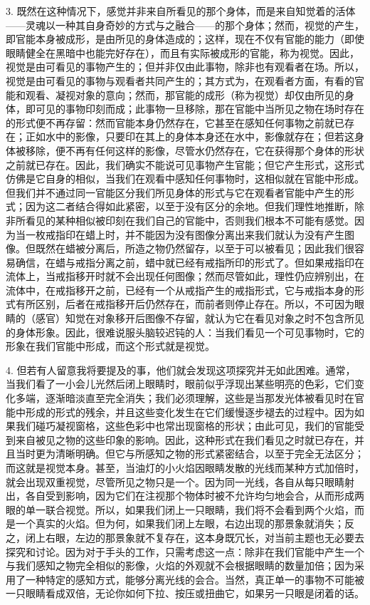 3. 既然在这种情况下，感觉并非来自所看见的那个身体，而是来自知觉着的活体——灵魂以一种其自身奇妙的方式与之融合——的那个身体；然而，视觉的产生，即官能本身被成形，是由所见的身体造成的；这样，现在不仅有官能的能力（即使眼睛健全在黑暗中也能完好存在），而且有实际被成形的官能，称为视觉。因此，视觉是由可看见的事物产生的；但并非仅由此事物，除非也有观看者在场。所以，视觉是由可看见的事物与观看者共同产生的；其方式为，在观看者方面，有看的官能和观看、凝视对象的意向；然而，那官能的成形（称为视觉）却仅由所见的身体，即可见的事物印刻而成；此事物一旦移除，那在官能中当所见之物在场时存在的形式便不再存留：然而官能本身仍然存在，它甚至在感知任何事物之前就已存在；正如水中的影像，只要印在其上的身体本身还在水中，影像就存在；但若这身体被移除，便不再有任何这样的影像，尽管水仍然存在，它在获得那个身体的形状之前就已存在。因此，我们确实不能说可见事物产生官能；但它产生形式，这形式仿佛是它自身的相似，当我们在观看中感知任何事物时，这相似就在官能中形成。但我们并不通过同一官能区分我们所见身体的形式与它在观看者官能中产生的形式；因为这二者结合得如此紧密，以至于没有区分的余地。但我们理性地推断，除非所看见的某种相似被印刻在我们自己的官能中，否则我们根本不可能有感觉。因为当一枚戒指印在蜡上时，并不能因为没有图像分离出来我们就认为没有产生图像。但既然在蜡被分离后，所造之物仍然留存，以至于可以被看见；因此我们很容易确信，在蜡与戒指分离之前，蜡中就已经有戒指所印的形式了。但如果戒指印在流体上，当戒指移开时就不会出现任何图像；然而尽管如此，理性仍应辨别出，在流体中，在戒指移开之前，已经有一个从戒指产生的戒指形式，它与戒指本身的形式有所区别，后者在戒指移开后仍然存在，而前者则停止存在。所以，不可因为眼睛的（感官）知觉在对象移开后图像不存留，就认为它在看见对象之时不包含所见的身体形象。因此，很难说服头脑较迟钝的人：当我们看见一个可见事物时，它的形象在我们官能中形成，而这个形式就是视觉。\par

4. 但若有人留意我将要提及的事，他们就会发现这项探究并无如此困难。通常，当我们看了一小会儿光然后闭上眼睛时，眼前似乎浮现出某些明亮的色彩，它们变化多端，逐渐暗淡直至完全消失；我们必须理解，这些是当那发光体被看见时在官能中形成的形式的残余，并且这些变化发生在它们缓慢逐步褪去的过程中。因为如果我们碰巧凝视窗格，这些色彩中也常出现窗格的形状；由此可见，我们的官能受到来自被见之物的这些印象的影响。因此，这种形式在我们看见之时就已存在，并且当时更为清晰明确。但它与所感知之物的形式紧密结合，以至于完全无法区分；而这就是视觉本身。甚至，当油灯的小火焰因眼睛发散的光线而某种方式加倍时，就会出现双重视觉，尽管所见之物只是一个。因为同一光线，各自从每只眼睛射出，各自受到影响，因为它们在注视那个物体时被不允许均匀地会合，从而形成两眼的单一联合视觉。所以，如果我们闭上一只眼睛，我们将不会看到两个火焰，而是一个真实的火焰。但为何，如果我们闭上左眼，右边出现的那景象就消失；反之，闭上右眼，左边的那景象就不复存在，这本身既冗长，对当前主题也无必要去探究和讨论。因为对于手头的工作，只需考虑这一点：除非在我们官能中产生一个与我们感知之物完全相似的影像，火焰的外观就不会根据眼睛的数量加倍；因为采用了一种特定的感知方式，能够分离光线的会合。当然，真正单一的事物不可能被一只眼睛看成双倍，无论你如何下拉、按压或扭曲它，如果另一只眼是闭着的话。\par

